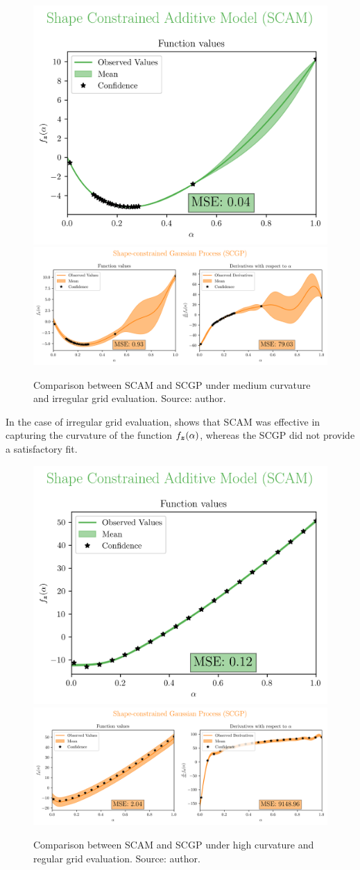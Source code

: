 \begin{figure}[H]
    \centering
    \includegraphics[width=.33\textwidth]{../experiments/adaptive_new_MC/SCAM_20_nobs.png}
    \includegraphics[width=.66\textwidth]{../experiments/adaptive_new_MC/SCGP_20_nobs.png}
    \caption{ {\small Comparison between SCAM and SCGP under medium curvature and irregular grid evaluation. Source: author.}}
    \label{fig:SCAMadaptiveMC}
\end{figure}

In the case of irregular grid evaluation,  shows that SCAM was effective in capturing the curvature of the function \( f_{\boldsymbol{z}}(\alpha) \), whereas the SCGP did not provide a satisfactory fit.

\begin{figure}[H]
    \centering
    \includegraphics[width=.33\textwidth]{../experiments/uniform_new_HC/SCAM_20_nobs.png}
    \includegraphics[width=.66\textwidth]{../experiments/uniform_new_HC/SCGP_20_nobs.png}
    \caption{ {\small Comparison between SCAM and SCGP under high curvature and regular grid evaluation. Source: author.}}
    \label{fig:SCAMuniformHC}
\end{figure}

